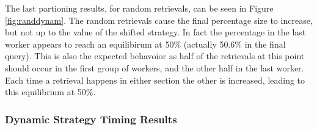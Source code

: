 \documentclass[11pt]{article} %
\begin{document}
The last partioning results, for random retrievals, can be seen in Figure \ref{fig:randdynam}. The random retrievals cause the final percentage size to increase, but not up to the value of the shifted strategy.  In fact the percentage in the last worker appears to reach an equilibirum at 50\% (actually 50.6\% in the final query).  This is also the expected behavoior as half of the retrievals at this point should occur in the first group of workers, and the other half in the last worker.  Each time a retrieval happens in either section the other is increased, leading to this equilibrium at 50\%.

\subsubsection{Dynamic Strategy Timing Results}
\end{document}
